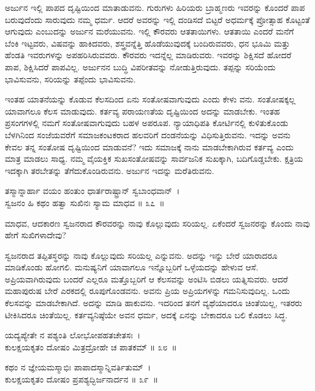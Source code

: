 ಅರ್ಜುನ ಇಲ್ಲಿ ಪಾಪದ ದೃಷ್ಟಿಯಿಂದ ಮಾತಾಡುವನು. ಗುರುಗಳು ಹಿರಿಯರು ಬ್ರಾಹ್ಮಣರು ಇವರನ್ನು ಕೊಂದರೆ ಪಾಪ ಬರುವುದೆಂದು ಸಾರುವುದು ನಮ್ಮ ಧರ್ಮ. ಆದರೆ ಅವರನ್ನು ಇಲ್ಲಿ ದಂಡಿಸದೆ ಬಿಟ್ಟರೆ ಅಧರ್ಮಕ್ಕೆ ಪ್ರೋತ್ಸಾಹ ಕೊಟ್ಟಂತೆ ಆಗುವುದು ಎಂಬುದನ್ನು ಅರ್ಜುನ ಮರೆಯುವನು. ಇಲ್ಲಿ ಕೌರವರು ಆತತಾಯಿಗಳು. ಆತತಾಯಿ ಎಂದರೆ ಮನೆಗೆ ಬೆಂಕಿ ಇಟ್ಟವರು, ವಿಷವನ್ನು ಹಾಕಿದವರು, ಶಸ್ತ್ರವನ್ನೆತ್ತಿ ಹೊಡೆಯುವುದಕ್ಕೆ ಬಂದಿರುವವರು, ಧನ ಭೂಮಿ ಮತ್ತು ಹೆಂಡತಿ ಇವರುಗಳನ್ನು ಅಪಹರಿಸಿರುವವರು. ಕೌರವರು ಇದನ್ನೆಲ್ಲ ಮಾಡಿರುವರು. ಇವರನ್ನು ಶಿಕ್ಷಿಸದೆ ಹೋದರೆ ಪಾಪ, ಶಿಕ್ಷಿಸಿದರೆ ಪಾಪವಿಲ್ಲ. ಅರ್ಜುನನ ಬುದ್ಧಿ ವಿಪರೀತವನ್ನು ನೋಡುತ್ತಿರುವುದು. ತಪ್ಪನ್ನು ಸರಿಯೆಂದು ಭಾವಿಸುವನು, ಸರಿಯನ್ನು ತಪ್ಪೆಂದು ಭಾವಿಸುವನು.

ಇಂತಹ ಯಾತನೆಯನ್ನು ಕೊಡುವ ಕೆಲಸದಿಂದ ಏನು ಸಂತೋಷವಾಗುವುದು ಎಂದು ಕೇಳು ವನು. ಸಂತೋಷಕ್ಕಲ್ಲ ಯಾವಾಗಲೂ ಕೆಲಸ ಮಾಡುವುದು. ಕರ್ತವ್ಯ ಪರಾಯಣತೆಯ ದೃಷ್ಟಿಯಿಂದ ಅದನ್ನು ಮಾಡಬೇಕು. ಇಂತಹ ಪ್ರಸಂಗಗಳಲ್ಲಿ ನಮಗೆ ಸಂತೋಷವಾಗುವುದು ಬಹಳ ಅಪರೂಪ. ನ್ಯಾಯಾಧಿಪತಿ ಕೋರ್ಟಿನಲ್ಲಿ ಕುಳಿತುಕೊಂಡು ಬೆಳಗಿನಿಂದ ಸಂಜೆಯವರೆಗೆ ಸಮಾಜಕಂಟಕರಾದ ಹಲವರಿಗೆ ದಂಡನೆಯನ್ನು ವಿಧಿಸುತ್ತಿರುವನು. ಇದನ್ನು ಅವನು ಕೇವಲ ತನ್ನ ಸಂತೋಷ ದೃಷ್ಟಿಯಿಂದ ಮಾಡುವನೆ? ಇದು ಸಮಾಜಕ್ಕೆ ನಾನು ಮಾಡಬೇಕಾಗಿರುವ ಕರ್ತವ್ಯ ಎಂದು ಮಾತ್ರ ಮಾಡಲು ಸಾಧ್ಯ. ನಮ್ಮ ವೈಯಕ್ತಿಕ ಸುಖಸಂತೋಷವನ್ನು ಸಾರ್ವಜನಿಕ ಸುಖಕ್ಕಾಗಿ, ಬದಿಗೊಡ್ಡಬೇಕು. ಕ್ಷತ್ರಿಯ ಇದಕ್ಕಾಗಿ ತರಬೇತನ್ನು ತೆಗೆದುಕೊಂಡಿರುವನು. ಅರ್ಜುನ ಇದನ್ನು ಮರೆತಿರುವನು.

\begin{shloka}
ತಸ್ಮಾನ್ನಾರ್ಹಾ ವಯಂ ಹಂತುಂ ಧಾರ್ತರಾಷ್ಟ್ರಾನ್ ಸ್ವಬಾಂಧವಾನ್~।\\ಸ್ವಜನಂ ಹಿ ಕಥಂ ಹತ್ವಾ ಸುಖಿನಃ ಸ್ಯಾಮ ಮಾಧವ \hfill॥ ೩೭~॥
\end{shloka}

\begin{artha}
ಮಾಧವ, ಆದಕಾರಣ ಸ್ವಜನರಾದ ಕೌರವರನ್ನು ನಾವು ಕೊಲ್ಲುವುದು ಸರಿಯಲ್ಲ. ಏಕೆಂದರೆ ಸ್ವಜನರನ್ನು ಕೊಂದು ನಾವು ಹೇಗೆ ಸುಖಿಗಳಾದೇವು?
\end{artha}

ಸ್ವಜನರಾದ ತಪ್ಪಿತಸ್ಥರನ್ನು ನಾವು ಕೊಲ್ಲುವುದು ಸರಿಯಲ್ಲ ಎನ್ನುವನು. ಅದನ್ನು ಇನ್ನು ಬೇರೆ ಯಾರಾದರೂ ಮಾಡಿಕೊಂಡು ಹೋಗಲಿ. ಮನುಷ್ಯನಿಗೆ ಯಾವಾಗಲೂ ಇನ್ನೊಬ್ಬರಿಗೆ ಒಳ್ಳೆಯದನ್ನು ಹೇಳುವ ಆಸೆ. ಅಪ್ರಿಯವಾಗಿರುವುದು ಬಂದರೆ ಎಲ್ಲರೂ ಮತ್ತೊಬ್ಬರಿಗೆ ಆ ಕೆಲಸವನ್ನು ಅಂಟಿಸಿ ಬಿಡಲು ಯತ್ನಿಸುವರು. ಆದರೆ ಮಹಾಪುರುಷ ಬೇರೆ ಎರಕದಲ್ಲಿ ರೂಪುಗೊಂಡ\-ವನು. ಅವನು ಪ್ರಿಯ ಅಪ್ರಿಯಗಳನ್ನು ಗಮನಿಸುವುದಿಲ್ಲ. ಒಂದು ಕೆಲಸವನ್ನು ಮಾಡಬೇಕಾಗಿದೆ. ಅದನ್ನು ಮಾಡಿ ಹಾಕುವನು. ಇದರಿಂದ ತನಗೆ ವ್ಯಥೆಯಾದರೂ ಚಿಂತೆಯಿಲ್ಲ, ಇತರರು ಟೀಕಿಸಿದರೂ ಚಿಂತೆಯಿಲ್ಲ. ಕರ್ತವ್ಯನಿಷ್ಠೆಯೇ ಅವನ ಧರ್ಮ, ಅದಕ್ಕೆ ಏನನ್ನು ಬೇಕಾದರೂ ಬಲಿ ಕೊಡಲು ಸಿದ್ಧ.

\begin{shloka}
ಯದ್ಯಪ್ಯೇತೇ ನ ಪಶ್ಯಂತಿ ಲೋಭೋಪಹತಚೇತಸಃ~।\\ಕುಲಕ್ಷಯಕೃತಂ ದೋಷಂ ಮಿತ್ರದ್ರೋಹೇ ಚ ಪಾತಕಮ್ \hfill॥ ೩೮~॥
\end{shloka}

\begin{shloka}
ಕಥಂ ನ ಜ್ಞೇಯಮಸ್ಮಾಭಿಃ ಪಾಪಾದಸ್ಮಾನ್ನಿವರ್ತಿತುಮ್~।\\ಕುಲಕ್ಷಯಕೃತಂ ದೋಷಂ ಪ್ರಪಶ್ಯದ್ಭಿರ್ಜನಾರ್ದನ \hfill॥ ೩೯~॥
\end{shloka}

